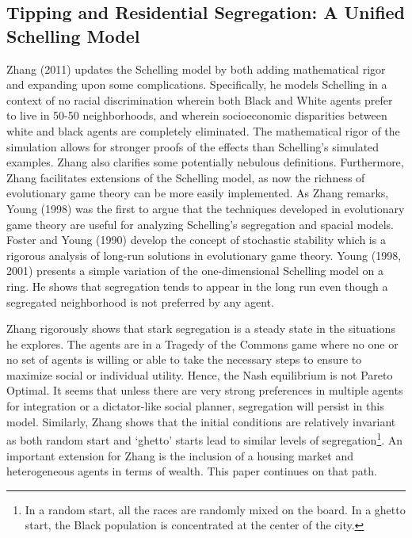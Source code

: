 \documentclass[11pt]{asaproc}
\newcommand{\1}{\mathbb{1}}
\begin{document}
\subsection{Tipping and Residential Segregation: A Unified Schelling Model}

Zhang (2011) \citep{zhang11} updates the Schelling model by both adding mathematical rigor and expanding upon some complications. Specifically, he models Schelling in a context of no racial discrimination wherein both Black and White agents prefer to live in 50-50 neighborhoods, and wherein socioeconomic disparities between white and black agents are completely eliminated. The mathematical rigor of the simulation allows for stronger proofs of the effects than Schelling's simulated examples. Zhang also clarifies some potentially nebulous definitions. Furthermore, Zhang facilitates extensions of the Schelling model, as now the richness of evolutionary game theory can be more easily implemented. As Zhang remarks, Young (1998) was the first to argue that the techniques developed in evolutionary game theory are useful for analyzing Schelling’s segregation and spacial models\citep{young98}. Foster and Young (1990) develop the concept of stochastic stability which is a rigorous analysis of long-run solutions in evolutionary game theory\citep{foster90}. Young (1998, 2001) presents a simple variation of the one-dimensional Schelling model on a ring\citep{young98,young01}. He shows that segregation tends to appear in the long run even though a segregated neighborhood is not preferred by any agent.

Zhang rigorously shows that stark segregation is a steady state in the situations he explores. The agents are in a Tragedy of the Commons game where no one or no set of agents is willing or able to take the necessary steps to ensure to maximize social or individual utility. Hence, the Nash equilibrium is not Pareto Optimal. It seems that unless there are very strong preferences in multiple agents for integration or a dictator-like social planner, segregation will persist in this model. Similarly, Zhang shows that the initial conditions are relatively invariant as both random start and `ghetto' starts lead to similar levels of segregation\footnote{In a random start, all the races are randomly mixed on the board. In a ghetto start, the Black population is concentrated at the center of the city.}. An important extension for Zhang is the inclusion of a housing market and heterogeneous agents in terms of wealth. This paper continues on that path.
\end{document}
